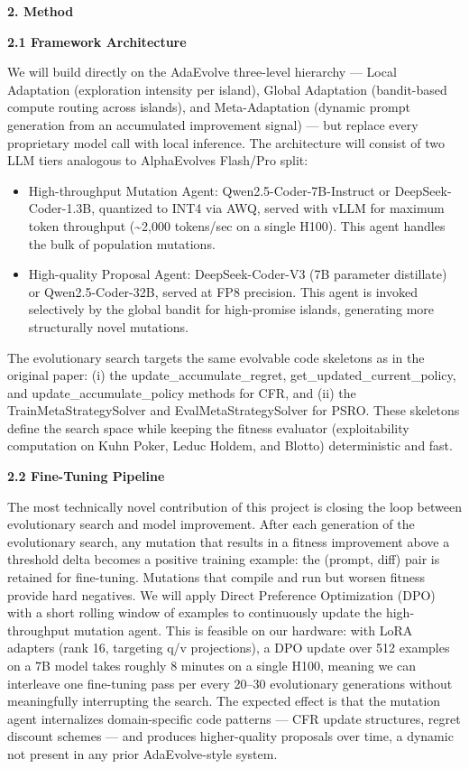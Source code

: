 \textbf{2. Method}

\textbf{2.1 Framework Architecture}

We will build directly on the AdaEvolve three-level hierarchy --- Local
Adaptation (exploration intensity per island), Global Adaptation
(bandit-based compute routing across islands), and Meta-Adaptation
(dynamic prompt generation from an accumulated improvement signal) ---
but replace every proprietary model call with local inference. The
architecture will consist of two LLM tiers analogous to
AlphaEvolve\textquotesingle s Flash/Pro split:

\begin{itemize}
\item
  High-throughput Mutation Agent: Qwen2.5-Coder-7B-Instruct or
  DeepSeek-Coder-1.3B, quantized to INT4 via AWQ, served with vLLM for
  maximum token throughput (\textasciitilde2,000 tokens/sec on a single
  H100). This agent handles the bulk of population mutations.
\item
  High-quality Proposal Agent: DeepSeek-Coder-V3 (7B parameter
  distillate) or Qwen2.5-Coder-32B, served at FP8 precision. This agent
  is invoked selectively by the global bandit for high-promise islands,
  generating more structurally novel mutations.
\end{itemize}

The evolutionary search targets the same evolvable code skeletons as in
the original paper: (i) the update\_accumulate\_regret,
get\_updated\_current\_policy, and update\_accumulate\_policy methods
for CFR, and (ii) the TrainMetaStrategySolver and EvalMetaStrategySolver
for PSRO. These skeletons define the search space while keeping the
fitness evaluator (exploitability computation on Kuhn Poker, Leduc
Hold\textquotesingle em, and Blotto) deterministic and fast.

\textbf{2.2 Fine-Tuning Pipeline}

The most technically novel contribution of this project is closing the
loop between evolutionary search and model improvement. After each
generation of the evolutionary search, any mutation that results in a
fitness improvement above a threshold delta becomes a positive training
example: the (prompt, diff) pair is retained for fine-tuning. Mutations
that compile and run but worsen fitness provide hard negatives. We will
apply Direct Preference Optimization (DPO) with a short rolling window
of examples to continuously update the high-throughput mutation agent.
This is feasible on our hardware: with LoRA adapters (rank 16, targeting
q/v projections), a DPO update over 512 examples on a 7B model takes
roughly 8 minutes on a single H100, meaning we can interleave one
fine-tuning pass per every 20--30 evolutionary generations without
meaningfully interrupting the search. The expected effect is that the
mutation agent internalizes domain-specific code patterns --- CFR update
structures, regret discount schemes --- and produces higher-quality
proposals over time, a dynamic not present in any prior AdaEvolve-style
system.

